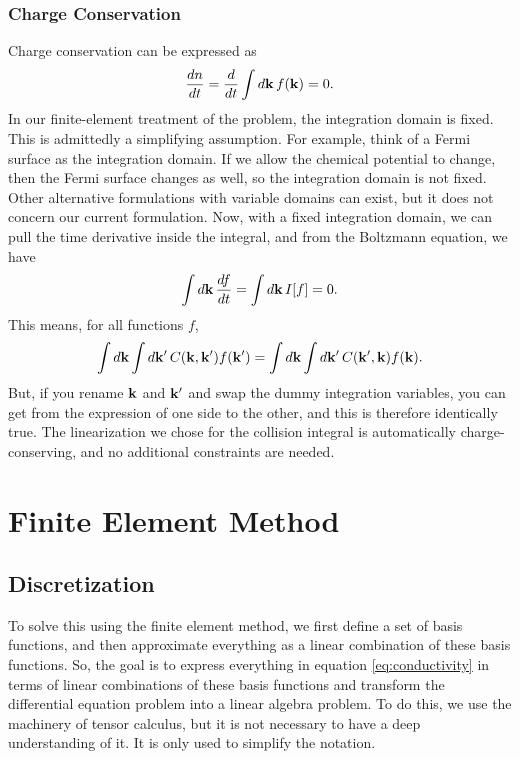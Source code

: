 \documentclass[12pt]{article}
\begin{document}
\subsubsection{Charge Conservation}
Charge conservation can be expressed as
\begin{equation}
    \dv{n}{t} = \dv{t} \int\dd{\vb{k}} f(\vb{k}) = 0.
\end{equation}
In our finite-element treatment of the problem, the integration domain is fixed. This is admittedly
a simplifying assumption. For example, think of a Fermi surface as the integration domain. If we
allow the chemical potential to change, then the Fermi surface changes as well, so the integration
domain is not fixed. Other alternative formulations with variable domains can exist, but it does not
concern our current formulation. Now, with a fixed integration domain, we can pull the time
derivative inside the integral, and from the Boltzmann equation, we have
\begin{equation}
    \int\dd{\vb{k}} \dv{f}{t} = \int\dd{\vb{k}} I[f] = 0.
\end{equation}
This means, for all functions $f$,
\begin{equation}
    \int\dd{\vb{k}} \int\dd{\vb{k'}} C(\vb{k}, \vb{k'}) f(\vb{k'})
    = \int\dd{\vb{k}} \int\dd{\vb{k'}} C(\vb{k'}, \vb{k}) f(\vb{k}).
\end{equation}
But, if you rename $\vb{k}$ and $\vb{k'}$ and swap the dummy integration variables, you can get from
the expression of one side to the other, and this is therefore identically true. The linearization
we chose for the collision integral is automatically charge-conserving, and no additional
constraints are needed.

\section{Finite Element Method} 
\subsection{Discretization}
To solve this using the finite element method, we first define a set of basis functions, and then
approximate everything as a linear combination of these basis functions. So, the goal is to express
everything in equation \eqref{eq:conductivity} in terms of linear combinations of these basis
functions and transform the differential equation problem into a linear algebra problem. To do this,
we use the machinery of tensor calculus, but it is not necessary to have a deep understanding of it.
It is only used to simplify the notation.
\end{document}
